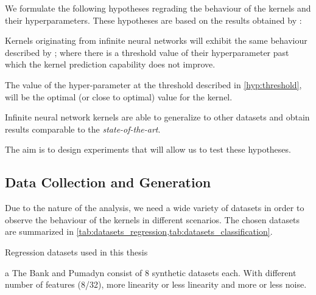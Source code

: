 We formulate the following hypotheses regrading the behaviour of the kernels and
their hyperparameters. These hypotheses are based on the results obtained by
\textcite{frenayParameterinsensitiveKernelExtreme2011}:

\begin{hypothesis}\label{hyp:threshold}
    Kernels originating from infinite neural networks will exhibit the same
    behaviour described by
    \textcite{frenayParameterinsensitiveKernelExtreme2011}; where there is a
    threshold value of their hyperparameter past which the kernel prediction
    capability does not improve.
\end{hypothesis}

\begin{hypothesis}
    The value of the hyper-parameter at the threshold described in
    \ref{hyp:threshold}, will be the optimal (or close to optimal) value for the
    kernel.
\end{hypothesis}

\begin{hypothesis}
    Infinite neural network kernels are able to generalize to other datasets and
    obtain results comparable to the \emph{state-of-the-art}.
\end{hypothesis}

The aim is to design experiments that will allow us to test these hypotheses.

\subsection{Data Collection and Generation}%

Due to the nature of the analysis, we need a wide variety of datasets in order
to observe the behaviour of the kernels in different scenarios. The chosen
datasets are summarized in \cref{tab:datasets_regression,tab:datasets_classification}.

\begin{table}[H]
    \begin{threeparttable}
        \caption{Regression datasets used in this thesis}
        \label{tab:datasets_regression}
        
        \begin{tablenotes}
            \item[a] The Bank and Pumadyn consist of 8 synthetic datasets each. With different
            number of features (8/32), more linearity or less linearity and more or less noise.
        \end{tablenotes}
    \end{threeparttable}
\end{table}

